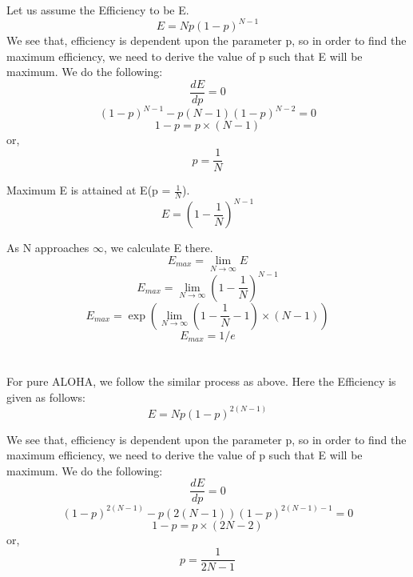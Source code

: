 \documentclass[12pt]{article}
\begin{document}
Let us assume the Efficiency to be E.
\begin{equation*}
    E = Np(1-p)^{N-1}
\end{equation*}
We see that, efficiency is dependent upon the parameter p, so in order to find the maximum efficiency, we need to derive the value of p such that E will be maximum.
We do the following:
\begin{equation*}
    \frac{dE}{dp} = 0
\end{equation*} 
\begin{equation*}
    (1-p)^{N-1} - p(N-1)(1-p)^{N-2} = 0
\end{equation*}
\begin{equation*}
    1-p = p \times (N-1)
\end{equation*}
or,
\begin{equation*}
    p = \frac{1}{N}    
\end{equation*}

Maximum E is attained at E(p = $\frac{1}{N}$).
\begin{equation*}
    E = (1 - \frac{1}{N})^{N-1}
\end{equation*}

As N approaches $\infty$, we calculate E there. 
\begin{equation*}
    E_{max} = \lim_{N \to \infty} E
\end{equation*}
\begin{equation*}
    E_{max} = \lim_{N \to \infty} (1 - \frac{1}{N})^{N-1}
\end{equation*}
\begin{equation*}
    E_{max} = \exp (\lim_{N \to \infty}(1 - \frac{1}{N} - 1) \times (N-1))
\end{equation*}
\begin{equation*}
    E_{max} = 1/e
\end{equation*}


\section{}
For pure ALOHA, we follow the similar process as above. Here the Efficiency is given as follows:
\begin{equation*}
    E = Np(1-p)^{2(N-1)}
\end{equation*}

We see that, efficiency is dependent upon the parameter p, so in order to find the maximum efficiency, we need to derive the value of p such that E will be maximum.
We do the following:
\begin{equation*}
    \frac{dE}{dp} = 0
\end{equation*} 
\begin{equation*}
    (1-p)^{2(N-1)} - p(2(N-1))(1-p)^{2(N-1)-1} = 0
\end{equation*}
\begin{equation*}
    1-p = p \times (2N-2)
\end{equation*}
or,
\begin{equation*}
    p = \frac{1}{2N-1}    
\end{equation*}
\end{document}
